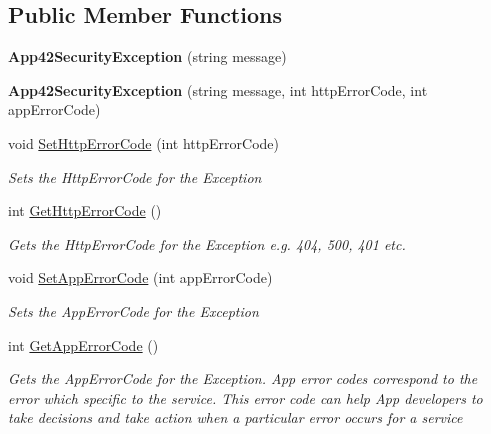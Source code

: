 \subsection*{Public Member Functions}
\begin{DoxyCompactItemize}
\item 
\hypertarget{classcom_1_1shephertz_1_1app42_1_1paas_1_1sdk_1_1csharp_1_1_app42_security_exception_aee3dc15d6c820bf29fd52816b4ec7bf2}{{\bfseries App42\+Security\+Exception} (string message)}\label{classcom_1_1shephertz_1_1app42_1_1paas_1_1sdk_1_1csharp_1_1_app42_security_exception_aee3dc15d6c820bf29fd52816b4ec7bf2}

\item 
\hypertarget{classcom_1_1shephertz_1_1app42_1_1paas_1_1sdk_1_1csharp_1_1_app42_security_exception_a73c421ad61ec6b251e64b8203f4e2e4d}{{\bfseries App42\+Security\+Exception} (string message, int http\+Error\+Code, int app\+Error\+Code)}\label{classcom_1_1shephertz_1_1app42_1_1paas_1_1sdk_1_1csharp_1_1_app42_security_exception_a73c421ad61ec6b251e64b8203f4e2e4d}

\item 
void \hyperlink{classcom_1_1shephertz_1_1app42_1_1paas_1_1sdk_1_1csharp_1_1_app42_security_exception_ad543b6738d39b698bb6a73a45632b8ab}{Set\+Http\+Error\+Code} (int http\+Error\+Code)
\begin{DoxyCompactList}\small\item\em Sets the Http\+Error\+Code for the Exception \end{DoxyCompactList}\item 
int \hyperlink{classcom_1_1shephertz_1_1app42_1_1paas_1_1sdk_1_1csharp_1_1_app42_security_exception_abc0125b05a75e4b5c4ec85a32e27a0b0}{Get\+Http\+Error\+Code} ()
\begin{DoxyCompactList}\small\item\em Gets the Http\+Error\+Code for the Exception e.\+g. 404, 500, 401 etc. \end{DoxyCompactList}\item 
void \hyperlink{classcom_1_1shephertz_1_1app42_1_1paas_1_1sdk_1_1csharp_1_1_app42_security_exception_a064808ab4e88e01aa4ad1a195a703c7f}{Set\+App\+Error\+Code} (int app\+Error\+Code)
\begin{DoxyCompactList}\small\item\em Sets the App\+Error\+Code for the Exception \end{DoxyCompactList}\item 
int \hyperlink{classcom_1_1shephertz_1_1app42_1_1paas_1_1sdk_1_1csharp_1_1_app42_security_exception_acc00635a299c191182189bf836d16d35}{Get\+App\+Error\+Code} ()
\begin{DoxyCompactList}\small\item\em Gets the App\+Error\+Code for the Exception. App error codes correspond to the error which specific to the service. This error code can help App developers to take decisions and take action when a particular error occurs for a service \end{DoxyCompactList}\end{DoxyCompactItemize}


